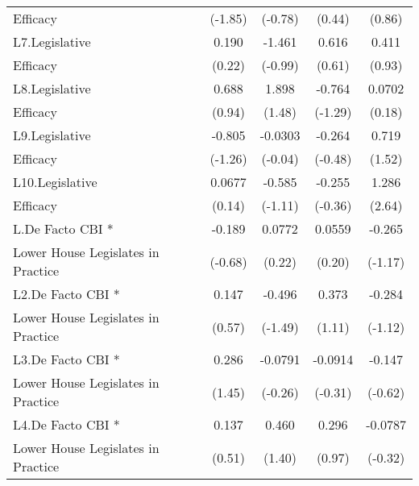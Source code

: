 {\begin{tabular}{l*{4}{c}}
Efficacy            &     (-1.85)         &     (-0.78)         &      (0.44)         &      (0.86)         \\
[1em]
L7.Legislative      &       0.190         &      -1.461         &       0.616         &       0.411         \\
Efficacy            &      (0.22)         &     (-0.99)         &      (0.61)         &      (0.93)         \\
[1em]
L8.Legislative      &       0.688         &       1.898         &      -0.764         &      0.0702         \\
Efficacy            &      (0.94)         &      (1.48)         &     (-1.29)         &      (0.18)         \\
[1em]
L9.Legislative      &      -0.805         &     -0.0303         &      -0.264         &       0.719         \\
Efficacy            &     (-1.26)         &     (-0.04)         &     (-0.48)         &      (1.52)         \\
[1em]
L10.Legislative     &      0.0677         &      -0.585         &      -0.255         &       1.286\sym{**} \\
Efficacy            &      (0.14)         &     (-1.11)         &     (-0.36)         &      (2.64)         \\
[1em]
L.De Facto CBI *    &      -0.189         &      0.0772         &      0.0559         &      -0.265         \\
Lower House Legislates in Practice&     (-0.68)         &      (0.22)         &      (0.20)         &     (-1.17)         \\
[1em]
L2.De Facto CBI *   &       0.147         &      -0.496         &       0.373         &      -0.284         \\
Lower House Legislates in Practice&      (0.57)         &     (-1.49)         &      (1.11)         &     (-1.12)         \\
[1em]
L3.De Facto CBI *   &       0.286         &     -0.0791         &     -0.0914         &      -0.147         \\
Lower House Legislates in Practice&      (1.45)         &     (-0.26)         &     (-0.31)         &     (-0.62)         \\
[1em]
L4.De Facto CBI *   &       0.137         &       0.460         &       0.296         &     -0.0787         \\
Lower House Legislates in Practice&      (0.51)         &      (1.40)         &      (0.97)         &     (-0.32)         \\

\end{tabular}}
